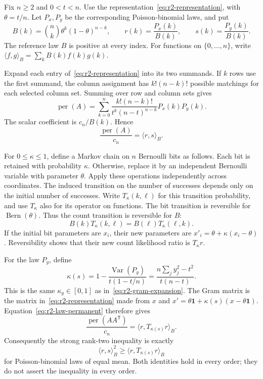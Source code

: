 \documentclass[11pt,a4paper]{article}
\theoremstyle{definition}
\theoremstyle{remark}
\newcommand{\per}{\operatorname{per}}
\newcommand{\T}{\mathsf{T}}
\begin{document}
Fix $n\ge2$ and $0<t<n$.
Use the representation~\eqref{eq:r2-representation}, with $\theta=t/n$.
Let $P_x,P_y$ be the corresponding Poisson-binomial laws, and put
\[
 B(k)=\binom nk\theta^k(1-\theta)^{n-k},\qquad
 r(k)=\frac{P_x(k)}{B(k)},\qquad s(k)=\frac{P_y(k)}{B(k)}.
\]
The reference law $B$ is positive at every index.
For functions on $\{0,\ldots,n\}$, write
$\langle f,g\rangle_B=\sum_k B(k)f(k)g(k)$.

Expand each entry of~\eqref{eq:r2-representation} into its two summands.
If $k$ rows use the first summand, the column assignment has $k!(n-k)!$ possible matchings for each selected column set.
Summing over row and column sets gives
\[
 \per(A)=\sum_{k=0}^n
 \frac{k!(n-k)!}{t^k(n-t)^{n-k}}P_x(k)P_y(k).
\]
The scalar coefficient is $c_n/B(k)$.
Hence
\begin{equation}\label{eq:r2-law-permanent}
 \frac{\per(A)}{c_n}=\langle r,s\rangle_B.
\end{equation}

For $0\le\kappa\le1$, define a Markov chain on $n$ Bernoulli bits as follows.
Each bit is retained with probability $\kappa$.
Otherwise, replace it by an independent Bernoulli variable with parameter $\theta$.
Apply these operations independently across coordinates.
The induced transition on the number of successes depends only on the initial number of successes.
Write $T_\kappa(k,\ell)$ for this transition probability, and use $T_\kappa$ also for its operator on functions.
The bit transition is reversible for $\operatorname{Bern}(\theta)$.
Thus the count transition is reversible for $B$:
\[
 B(k)T_\kappa(k,\ell)=B(\ell)T_\kappa(\ell,k).
\]
If the initial bit parameters are $x_i$, their new parameters are
$x'_i=\theta+\kappa(x_i-\theta)$.
Reversibility shows that their new count likelihood ratio is $T_\kappa r$.

For the law $P_y$, define
\begin{equation}\label{eq:r2-law-kappa}
 \kappa(s)=1-\frac{\operatorname{Var}(P_y)}{t(1-t/n)}
 =\frac{n\sum_j y_j^2-t^2}{t(n-t)}.
\end{equation}
This is the same $\kappa_y\in[0,1]$ as in~\eqref{eq:r2-gram-expansion}.
The Gram matrix is the matrix in~\eqref{eq:r2-representation} made from $x$ and
$x'=\theta\mathbf1+\kappa(s)(x-\theta\mathbf1)$.
Equation~\eqref{eq:r2-law-permanent} therefore gives
\begin{equation}\label{eq:r2-law-gram}
 \frac{\per(AA^\T)}{c_n}=\langle r,T_{\kappa(s)}r\rangle_B.
\end{equation}
Consequently the strong rank-two inequality is exactly
\begin{equation}\label{eq:r2-two-law-target}
 \langle r,s\rangle_B^2\ge\langle r,T_{\kappa(s)}r\rangle_B
\end{equation}
for Poisson-binomial laws of equal mean.
Both identities hold in every order; they do not assert the inequality in every order.
\end{document}
